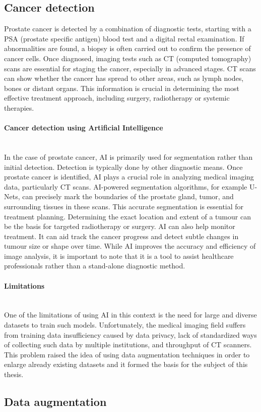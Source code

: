 \newpage
\subsection{Cancer detection}
Prostate cancer is detected by a combination of diagnostic tests, starting with a PSA (prostate specific antigen) blood test and a digital rectal examination. If abnormalities are found, a biopsy is often carried out to confirm the presence of cancer cells. Once diagnosed, imaging tests such as CT (computed tomography) scans are essential for staging the cancer, especially in advanced stages. CT scans can show whether the cancer has spread to other areas, such as lymph nodes, bones or distant organs. This information is crucial in determining the most effective treatment approach, including surgery, radiotherapy or systemic therapies.
\paragraph{Cancer detection using Artificial Intelligence}\mbox{}\\
\indent In the case of prostate cancer, AI is primarily used for segmentation rather than initial detection. Detection is typically done by other diagnostic means. Once prostate cancer is identified, AI plays a crucial role in analyzing medical imaging data, particularly CT scans. AI-powered segmentation algorithms, for example U-Nets, can precisely mark the boundaries of the prostate gland, tumor, and surrounding tissues in these scans. This accurate segmentation is essential for treatment planning. Determining the exact location and extent of a tumour can be the basis for targeted radiotherapy or surgery. AI can also help monitor treatment. It can aid track the cancer progress and detect subtle changes in tumour size or shape over time. While AI improves the accuracy and efficiency of image analysis, it is important to note that it is a tool to assist healthcare professionals rather than a stand-alone diagnostic method. 

\paragraph{Limitations}\mbox{}\\
\indent One of the limitations of using AI in this context is the need for large and diverse datasets to train such models. Unfortunately, the medical imaging field suffers from training data insufficiency caused by data privacy, lack of standardized ways of collecting such data by multiple institutions, and throughput of CT scanners. 
This problem raised the idea of using data augmentation techniques in order to enlarge already existing datasets and it formed the basis for the subject of this thesis.

\newpage
\subsection{Data augmentation}
